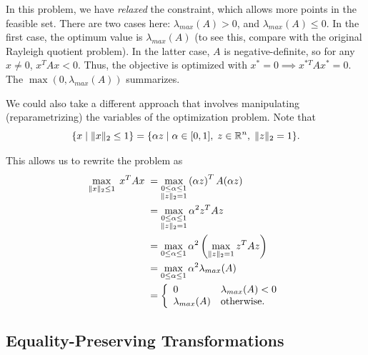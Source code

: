 \documentclass[12pt]{article}
\begin{document}
\begin{itemize}
In this problem, we have \textit{relaxed} the constraint, which allows more points in the feasible set. There are two cases here: $\lambda_{max}(A) > 0$, and $\lambda_{max}(A) \leq 0$. In the first case, the optimum value is $\lambda_{max} (A)$ (to see this, compare with the original Rayleigh quotient problem). In the latter case, $A$ is negative-definite, so for any $x \neq 0$, $x^T A x < 0$. Thus, the objective is optimized with $x^* = 0 \implies x^{*T} A x^* = 0$. The $\max(0, \lambda_{max}(A))$ summarizes. 

We could also take a different approach that involves manipulating (reparametrizing) the variables of the optimization problem. Note that
%
\begin{equation*}
\{x \; | \; \|x\|_2 \leq 1\} = \{\alpha z \; | \; \alpha \in [0,1], \; z \in { {\mathbb R}^{n} }, \; \|z\|_2 = 1\}.
\end{equation*}

This allows us to rewrite the problem as
%
\begin{align*}
\max_{ \|x\|_2 \leq 1 } \; x^T A x \; &= \max_{\begin{subarray}{c} 0 \leq \alpha \leq 1 \\ \|z\|_2 = 1 \end{subarray}} \left( \alpha z \right)^T A (\alpha z) \\
&= \max_{\begin{subarray}{c} 0 \leq \alpha \leq 1 \\ \|z\|_2 = 1 \end{subarray}} \alpha^2 z^T A z \\ 
&= \max_{0 \leq \alpha \leq 1}  \alpha^2 \left( \max_{\|z\|_2 = 1} z^T A z \right) \\
&= \max_{0 \leq \alpha \leq 1}  \alpha^2 \lambda_{max}(A) \\
&= \left\{ \begin{array}{ll}
0 & \lambda_{max}(A) < 0 \\
\lambda_{max}(A) & \text{otherwise}.
\end{array}\right.
\end{align*}

\end{itemize}

\subsection{Equality-Preserving Transformations}
\end{document}
